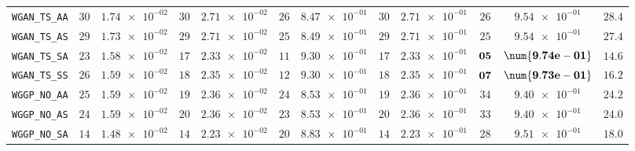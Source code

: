 \begin{xltabular}{\textwidth}{l||cC|cC|cC|cC|cC||c}
	\texttt{WGAN\_TS\_AA} & $ 30$ & $ \num{1.74e-02}$ & $ 30$ & $ \num{2.71e-02}$ & $ 26$ & $ \num{8.47e-01}$ & $ 30$ & $ \num{2.71e-01}$ & $ 26$ & $ \num{9.54e-01}$ & $ 28.4$  \\
	\texttt{WGAN\_TS\_AS} & $ 29$ & $ \num{1.73e-02}$ & $ 29$ & $ \num{2.71e-02}$ & $ 25$ & $ \num{8.49e-01}$ & $ 29$ & $ \num{2.71e-01}$ & $ 25$ & $ \num{9.54e-01}$ & $ 27.4$  \\
	\texttt{WGAN\_TS\_SA} & $ 23$ & $ \num{1.58e-02}$ & $ 17$ & $ \num{2.33e-02}$ & $ 11$ & $ \num{9.30e-01}$ & $ 17$ & $ \num{2.33e-01}$ & $\bf 05$ & $\bf \num{9.74e-01}$ & $ 14.6$  \\
	\texttt{WGAN\_TS\_SS} & $ 26$ & $ \num{1.59e-02}$ & $ 18$ & $ \num{2.35e-02}$ & $ 12$ & $ \num{9.30e-01}$ & $ 18$ & $ \num{2.35e-01}$ & $\bf 07$ & $\bf \num{9.73e-01}$ & $ 16.2$  \\ \midrule
	\texttt{WGGP\_NO\_AA} & $ 25$ & $ \num{1.59e-02}$ & $ 19$ & $ \num{2.36e-02}$ & $ 24$ & $ \num{8.53e-01}$ & $ 19$ & $ \num{2.36e-01}$ & $ 34$ & $ \num{9.40e-01}$ & $ 24.2$  \\
	\texttt{WGGP\_NO\_AS} & $ 24$ & $ \num{1.59e-02}$ & $ 20$ & $ \num{2.36e-02}$ & $ 23$ & $ \num{8.53e-01}$ & $ 20$ & $ \num{2.36e-01}$ & $ 33$ & $ \num{9.40e-01}$ & $ 24.0$  \\
	\texttt{WGGP\_NO\_SA} & $ 14$ & $ \num{1.48e-02}$ & $ 14$ & $ \num{2.23e-02}$ & $ 20$ & $ \num{8.83e-01}$ & $ 14$ & $ \num{2.23e-01}$ & $ 28$ & $ \num{9.51e-01}$ & $ 18.0$  \\

\end{xltabular}
